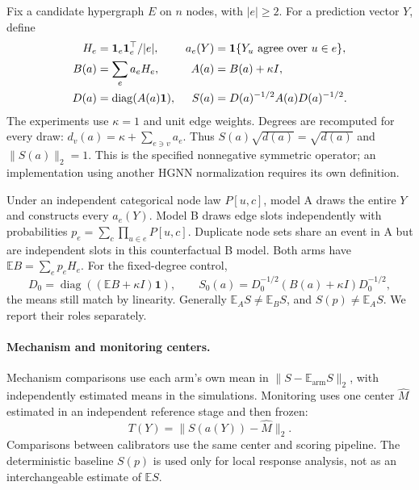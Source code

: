 Fix a candidate hypergraph $E$ on $n$ nodes, with $|e|\ge2$.
For a prediction vector $Y$, define
\begin{equation}\label{eq:norm-operator}
\begin{aligned}
H_e&=\mathbf1_e\mathbf1_e^\top/|e|,&
a_e(Y)&=\mathbf{1}\{Y_u\text{ agree over }u\in e\},\\
B(a)&=\sum_e a_eH_e,& A(a)&=B(a)+\kappa I,\\
D(a)&=\operatorname{diag}(A(a)\mathbf1),&
S(a)&=D(a)^{-1/2}A(a)D(a)^{-1/2}.
\end{aligned}
\end{equation}
The experiments use $\kappa=1$ and unit edge weights. Degrees are
recomputed for every draw: $d_v(a)=\kappa+\sum_{e\ni v}a_e$.
Thus $S(a)\sqrt{d(a)}=\sqrt{d(a)}$ and $\|S(a)\|_2=1$.
This is the specified nonnegative symmetric operator; an implementation
using another HGNN normalization requires its own definition.

Under an independent categorical node law $P[u,c]$, model A draws the
entire $Y$ and constructs every $a_e(Y)$. Model B draws edge slots
independently with probabilities
$p_e=\sum_c\prod_{u\in e}P[u,c]$. Duplicate node sets share an event
in A but are independent slots in this counterfactual B model.
Both arms have $\mathbb E B=\sum_ep_eH_e$. For the fixed-degree control,
\begin{equation}\label{eq:fixed-degree}
D_0=\operatorname{diag}((\mathbb E B+\kappa I)\mathbf1),\qquad
S_0(a)=D_0^{-1/2}(B(a)+\kappa I)D_0^{-1/2},
\end{equation}
the means still match by linearity. Generally
$\mathbb E_A S\ne\mathbb E_B S$, and
$S(p)\ne\mathbb E_A S$. We report their roles separately.

\paragraph{Mechanism and monitoring centers.}
Mechanism comparisons use each arm's own mean in
$\|S-\mathbb E_{\mathrm{arm}}S\|_2$, with independently estimated
means in the simulations. Monitoring uses one center $\widehat M$
estimated in an independent reference stage and then frozen:
\begin{equation}\label{eq:monitor-score}
T(Y)=\|S(a(Y))-\widehat M\|_2.
\end{equation}
Comparisons between calibrators use the same center and scoring
pipeline. The deterministic baseline $S(p)$ is used only for local
response analysis, not as an interchangeable estimate of $\mathbb E S$.

